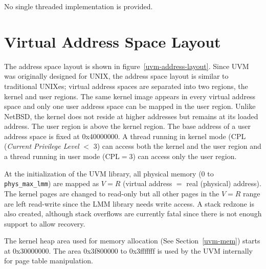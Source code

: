 No single threaded implementation is provided.

\section{Virtual Address Space Layout}
\label{netbsd-uvm-address-space}

The address space layout is shown in figure~\ref{uvm-address-layout}.
Since UVM was originally designed for UNIX, the address space layout is similar
to traditional UNIXes; virtual address spaces are separated into two
regions, the kernel and user regions.  The same kernel image appears
in every virtual address space and only one user address space can be
mapped in the user region.  Unlike NetBSD, the kernel does not reside
at higher addresses but remains at its loaded address.  The user region is
above the kernel region.  The base address of a user address space is
fixed at 0x40000000.  A thread running in kernel mode (CPL
(\emph{Current Privilege Level} $<$ 3) can access both the kernel and
the user region and a thread running in user mode (CPL$=$3) can access
only the user region.

At the initialization of the UVM library, all physical memory (0 to
\texttt{phys_max_lmm}) are mapped as $V=R$ (virtual address $=$ real
(physical) address).  The kernel pages are changed to read-only but
all other pages in the $V=R$ range are left read-write since the \oskit{} LMM
library needs write access.  A stack redzone is also created, although
stack overflows are currently fatal since there is not enough support to allow
recovery.

The kernel heap area used for memory allocation (See
Section~\ref{uvm-mem}) starts at 0x30000000.  The area 0x3f800000 to
0x3fffffff is used by the UVM internally for page table manipulation.


